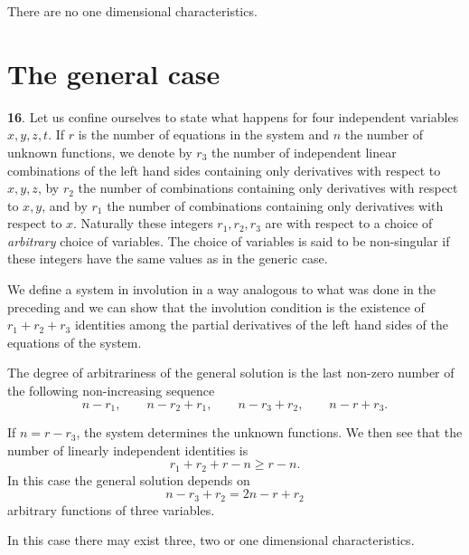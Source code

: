 \documentclass[leqno,11pt]{article}
\theoremstyle{shape1}
\theoremstyle{shape0}
\theoremstyle{shape2}
\theoremstyle{definition}
\begin{document}
There are no one dimensional characteristics.

\section{The general case}
\label{sec:general-case}

\textbf{16}. Let us confine ourselves to state what happens for four independent variables $x,y,z,t$. If $r$ is the number of equations in the system and $n$ the number of unknown functions, we denote by $r_{3}$ the number of independent linear combinations of the left hand sides containing only derivatives with respect to $x,y,z$, by $r_{2}$ the number of combinations  containing only  derivatives with respect to $x,y$, and by $r_{1}$ the number of combinations containing only derivatives with respect to $x$. Naturally these integers $r_{1},r_{2},r_{3}$ are with respect to a choice of \emph{arbitrary} choice of variables. The choice of variables is said to be non-singular if these integers have the same values as in the generic case.

We define a system in involution in a way analogous to what was done in the preceding and we can show that the involution condition is the existence of $r_{1}+r_{2}+r_{3}$ identities among the partial derivatives of the left hand sides of the equations of the system.

The degree of arbitrariness of the general solution is the last non-zero number of the following non-increasing sequence
\[
n-r_{1},\qquad n-r_{2}+r_{1},\qquad n-r_{3}+r_{2},\qquad n-r+r_{3}.
\]

If $n=r-r_{3}$, the system determines the unknown functions. We then see that the number of linearly independent identities is
\[
r_{1}+r_{2}+r-n\ge r-n.
\]
In this case the general solution depends on
\[
n-r_{3}+r_{2}=2n-r+r_{2}
\]
arbitrary functions of three variables.

In this case there may exist three, two or one dimensional characteristics.

\vspace{12pt}
\end{document}
